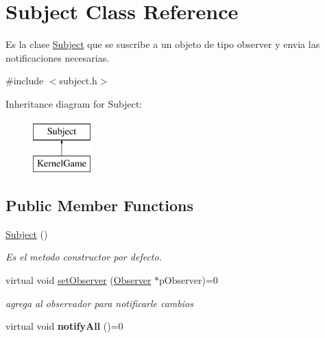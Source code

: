 \hypertarget{class_subject}{\section{Subject Class Reference}
\label{class_subject}
}


Es la clase \hyperlink{class_subject}{Subject} que se suscribe a un objeto de tipo observer y envia las notificaciones necesarias.  




{\ttfamily \#include $<$subject.\-h$>$}

Inheritance diagram for Subject\-:\begin{figure}[H]
\begin{center}
\leavevmode
\includegraphics[height=2.000000cm]{class_subject}
\end{center}
\end{figure}
\subsection*{Public Member Functions}
\begin{DoxyCompactItemize}
\item 
\hypertarget{class_subject_ab468044832c824c6d6c2f46272655207}{\hyperlink{class_subject_ab468044832c824c6d6c2f46272655207}{Subject} ()}\label{class_subject_ab468044832c824c6d6c2f46272655207}

\begin{DoxyCompactList}\small\item\em Es el metodo constructor por defecto. \end{DoxyCompactList}\item 
virtual void \hyperlink{class_subject_a6d5613efb046d8db0fe467a5314f1e66}{set\-Observer} (\hyperlink{class_observer}{Observer} $\ast$p\-Observer)=0
\begin{DoxyCompactList}\small\item\em agrega al observador para notificarle cambios \end{DoxyCompactList}\item 
\hypertarget{class_subject_a7ef335c1bea008ee4d3dada9db2db50d}{virtual void {\bfseries notify\-All} ()=0}\label{class_subject_a7ef335c1bea008ee4d3dada9db2db50d}

\end{DoxyCompactItemize}


